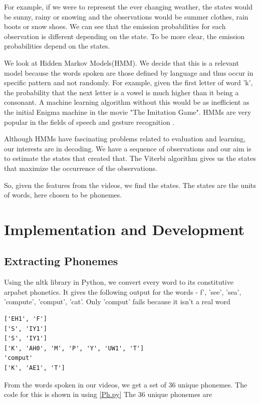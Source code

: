 \documentclass[a4paper]{article}
\begin{document}
For example, if we were to represent the ever changing weather, the states would be sunny, rainy or snowing and the observations would be summer clothes, rain boots or snow shoes. We can see that the emission probabilities for each observation is different depending on the state. To be more clear, the emission probabilities depend on the states.

We look at Hidden Markov Models(HMM). We decide that this is a relevant model because the words spoken are those defined by language and thus occur in specific pattern and not randomly. For example, given the first letter of word 'k', the probability that the next letter is a vowel is much higher than it being a consonant. A machine learning algorithm without this would be as inefficient as the initial Enigma machine in the movie "The Imitation Game". HMMs are very popular in the fields of speech \cite{key-2} and gesture recognition \cite{key-4} \cite{key-5}.

Although HMMs have fascinating problems related to evaluation and learning, our interests are in decoding. We have a sequence of observations and our aim is to estimate the states that created that. The Viterbi algorithm \cite{key-3} gives us the states that maximize the occurrence of the observations. 

So, given the features from the videos, we find the states. The states are the units of words, here chosen to be phonemes. 
\section{Implementation and Development}

\subsection{Extracting Phonemes}

Using the nltk library in Python, we convert every word to its constitutive arpabet phonetics. It gives the following output for the words - f', 'see', 'sea', 'compute', 'comput', 'cat'. Only 'comput' fails because it isn't a real word
\begin{verbatim}
['EH1', 'F']
['S', 'IY1']
['S', 'IY1']
['K', 'AH0', 'M', 'P', 'Y', 'UW1', 'T']
'comput'
['K', 'AE1', 'T']
\end{verbatim}

From the words spoken in our videos, we get a set of 36 unique phonemes. The code for this is shown in using \ref{Ph.py} The 36 unique phonemes are 
\end{document}
